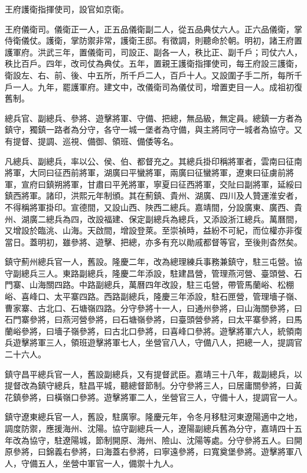 王府護衛指揮使司，設官如京衛。

王府儀衛司。儀衛正一人，正五品儀衛副二人，從五品典仗六人。正六品儀衛，掌侍衛儀仗。護衛，掌防禦非常，護衛王邸。有徵調，則聽命於朝。明初，諸王府置護軍府。洪武三年，置儀衛司，司設正、副各一人，秩比正、副千戶；司仗六人，秩比百戶。四年，改司仗為典仗。五年，置親王護衛指揮使司，每王府設三護衛，衛設左、右、前、後、中五所，所千戶二人，百戶十人。又設圍子手二所，每所千戶一人。九年，罷護軍府。建文中，改儀衛司為儀仗司，增置吏目一人。成祖初復舊制。

總兵官、副總兵、參將、遊擊將軍、守備、把總，無品級，無定員。總鎮一方者為鎮守，獨鎮一路者為分守，各守一城一堡者為守備，與主將同守一城者為協守。又有提督、提調、巡視、備御、領班、備倭等名。

凡總兵、副總兵，率以公、侯、伯、都督充之。其總兵掛印稱將軍者，雲南曰征南將軍，大同曰征西前將軍，湖廣曰平蠻將軍，兩廣曰征蠻將軍，遼東曰征虜前將軍，宣府曰鎮朔將軍，甘肅曰平羌將軍，寧夏曰征西將軍，交阯曰副將軍，延綏曰鎮西將軍。諸印，洪熙元年制頒。其在薊鎮、貴州、湖廣、四川及人贊運淮安者，不得稱將軍掛印。宣德間，又設山西、陜西二總兵。嘉靖間，分設廣東、廣西、貴州、湖廣二總兵為四，改設福建、保定副總兵為總兵，又添設浙江總兵。萬曆間，又增設於臨洮、山海。天啟間，增設登萊。至崇禎時，益紛不可紀，而位權亦非復當日。蓋明初，雖參將、遊擊、把總，亦多有充以勛戚都督等官，至後則杳然矣。

鎮守薊州總兵官一人，舊設。隆慶二年，改為總理練兵事務兼鎮守，駐三屯營。協守副總兵三人。東路副總兵，隆慶二年添設，駐建昌營，管理燕河營、臺頭營、石門寨、山海關四路。中路副總兵，萬曆四年改設，駐三屯營，帶管馬蘭峪、松棚峪、喜峰口、太平寨四路。西路副總兵，隆慶三年添設，駐石匣營，管理墻子嶺、曹家寨、古北口、石塘嶺四路。分守參將十一人，曰通州參將，曰山海關參將，曰石門寨參將，曰燕河營參將，曰石塘嶺參將，曰臺頭營參將，曰太平寨參將，曰馬蘭峪參將，曰墻子嶺參將，曰古北口參將，曰喜峰口參將。遊擊將軍六人，統領南兵遊擊將軍三人，領班遊擊將軍七人，坐營官八人，守備八人，把總一人，提調官二十六人。

鎮守昌平總兵官一人，舊設副總兵，又有提督武臣。嘉靖三十八年，裁副總兵，以提督改為鎮守總兵，駐昌平城，聽總督節制。分守參將三人，曰居庸關參將，曰黃花鎮參將，曰橫嶺口參將。遊擊將軍二人，坐營官三人，守備十人，提調官一人。

鎮守遼東總兵官一人，舊設，駐廣寧。隆慶元年，令冬月移駐河東遼陽適中之地，調度防禦，應援海州、沈陽。協守副總兵一人，遼陽副總兵舊為分守，嘉靖四十五年改為協守，駐遼陽城，節制開原、海州、險山、沈陽等處。分守參將五人。曰開原參將，曰錦義右參將，曰海蓋右參將，曰寧遠參將，曰寬奠堡參將。遊擊將軍八人，守備五人，坐營中軍官一人，備禦十九人。

